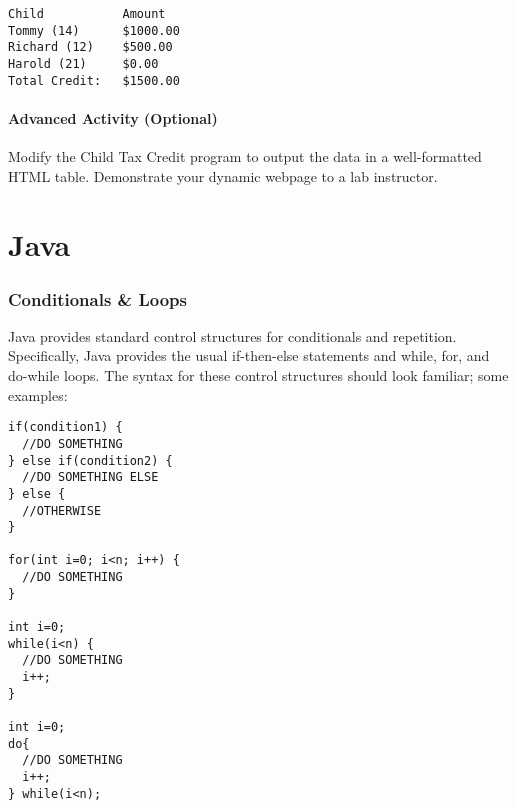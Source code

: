 \documentclass[12pt]{scrartcl}
\begin{document}
\begin{verbatim}
Child           Amount
Tommy (14)      $1000.00
Richard (12)    $500.00
Harold (21)     $0.00
Total Credit:   $1500.00
\end{verbatim}

	
\subsection*{Advanced Activity (Optional)}
	
Modify the Child Tax Credit program to output the data in a 
well-formatted HTML table.  Demonstrate your dynamic webpage 
to a lab instructor.


\newpage
\part*{Java}

\section*{Conditionals \& Loops}

Java provides standard control structures for conditionals and 
repetition.  Specifically, Java provides the usual if-then-else 
statements and while, for, and do-while loops.  The syntax for 
these control structures should look familiar; some examples:

\begin{verbatim}
if(condition1) {
  //DO SOMETHING
} else if(condition2) {
  //DO SOMETHING ELSE
} else {
  //OTHERWISE
}

for(int i=0; i<n; i++) {
  //DO SOMETHING
}

int i=0;
while(i<n) {
  //DO SOMETHING
  i++;
}

int i=0;
do{ 
  //DO SOMETHING
  i++;
} while(i<n);
\end{verbatim}
\end{document}
